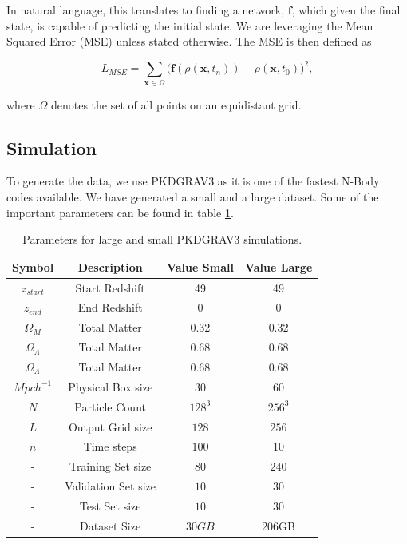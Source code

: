 \documentclass{article}
\begin{document}
In natural language, this translates to finding a network, $\mathbf{f}$, which given the final state, is capable of predicting the initial state. We are leveraging the Mean Squared Error (MSE) unless stated otherwise. The MSE is then defined as

\begin{equation}
    L_{MSE} = \sum_{\mathbf{x} \in  \Omega} \Biggl(\mathbf{f}(\rho(\mathbf{x}, t_{n})) - \rho(\mathbf{x}, t_0)\Biggr)^2,
\end{equation}

where $\Omega$ denotes the set of all points on an equidistant grid. 

\subsection{Simulation}

To generate the data, we use PKDGRAV3 \citep{potter2017pkdgrav3} as it is one of the fastest N-Body codes available. We have generated a small and a large dataset. Some of the important parameters can be found in table \ref{table:1}.

\begin{table}[h!]
\centering
\begin{tabular}{||c c c c||} 
 \hline
 Symbol & Description & Value Small & Value Large \\ [0.5ex] 
 \hline\hline
  $z_{start}$ & Start Redshift & 49 & 49 \\ 
 \hline
$z_{end}$ & End Redshift & 0 & 0\\  [1ex] 
\hline
$\Omega_M$ & Total Matter & 0.32 & 0.32 \\  [1ex] 
 \hline
 $\Omega_{\Lambda}$ & Total Matter & 0.68 & 0.68 \\  [1ex] 
 \hline
  $\Omega_{\Lambda}$ & Total Matter & 0.68 & 0.68 \\  [1ex] 
 \hline
   $Mpc h^{-1}$ & Physical Box size & 30 & 60 \\  [1ex] 
 \hline
    $N$& Particle Count & $128^3$ & $256^3$ \\  [1ex] 
 \hline
     $L$& Output Grid size & $128$ & $256$ \\  [1ex] 
 \hline
      $n$& Time steps & $100$ & $10$ \\  [1ex] 
 \hline
    -& Training Set size & $80$ & $240$ \\  [1ex] 
 \hline
     - & Validation Set size & $10$ & $30$ \\  [1ex] 
  \hline
 - & Test Set size & $10$ & $30$ \\  [1ex] 
  \hline
   - & Dataset Size & $30GB$ & 206GB \\  [1ex] 
  \hline
\end{tabular}
\caption{Parameters for large and small PKDGRAV3 simulations.}
\label{table:1}
\end{table}
\end{document}
